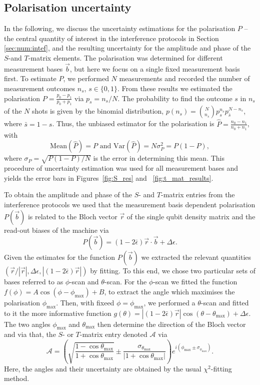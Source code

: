 \documentclass[a4paper,twocolumn,11pt]{quantumarticle}
\begin{document}
\subsection{Polarisation uncertainty} \label{app:DATA_Anl}In the following, we discuss the uncertainty estimations for the polarisation $P$ -- the central quantity of interest in the interference protocols in Section \ref{sec:num:intef}, and the resulting uncertainty for the amplitude and phase of the $S$-and $T$-matrix elements. The polarisation was determined for different measurement bases $\vec b$, but here we focus on a single fixed measurement basis first. To estimate $P$, we performed $N$ measurements and recorded the number of measurement outcomes $n_s$, $s\in \{0,1\}$. From these results we estimated the polarisation $P = \frac{p_0 - p_1}{p_0 + p_1}$ via $p_s=n_s/N$. The probability to find the outcome $s$ in $n_s$ of the $N$ shots is given by the binomial distribution, $p(n_s) = {N \choose n_s} p_s^{n_s} p_{\bar{s}}^{N-n_s}$, where $\bar{s} = 1-s$. Thus,
the unbiased estimator for the polarisation is $\hat P = \frac{n_0 - n_1}{n_0 + n_1}$, with $$\text{Mean}(\hat P) =P\text{ and }\text{Var}(\hat{P}) = N\sigma_{P}^2 = P(1-P),$$ where $\sigma_{P}=\sqrt{P(1-P)/N}$ is the error in determining this mean. This procedure of uncertainty estimation was used for all measurement bases and yields the error bars in Figures~\ref{fig:S_res} and ~\ref{fig:t_mat_results}.

To obtain the amplitude and phase of the $S$- and $T$-matrix entries from the interference protocols we used that the measurement basis dependent polarisation $P(\vec b)$ is related to the Bloch vector $\vec r$ of the single qubit density matrix and the read-out biases of the machine via
$$P(\vec{b}) = (1-2\bar\epsilon)\vec{r}\cdot\vec{b} + \Delta\epsilon.$$ 
Given the estimates for the function $P(\vec{b})$ we extracted the relevant quantities $(\vec{r}/|\vec{r}|, \Delta\epsilon, |(1-2\bar\epsilon)\vec{r}|)$ by fitting. To this end, we chose two particular sets of bases referred to as $\phi$-scan and $\theta$-scan. For the $\phi$-scan we fitted the function $f(\phi) = A\cos(\phi - \phi_{\text{max}})+B$, to extract the angle which maximises the polarisation $\phi_{\text{max}}$. Then, with fixeed $\phi = \phi_{\text{max}}$, we performed a $\theta$-scan and fitted to it the more informative function $g(\theta) = |(1-2\bar\epsilon)\vec{r}|\cos(\theta - \theta_{\text{max}}) + \Delta\epsilon$. The two angles $\phi_\text{max}$ and $\theta_\text{max}$ then determine the direction of the Bloch vector and via that, the $S$- or $T$-matrix entry denoted $\mathcal A$ via  
$$\mathcal{A} = \left(\sqrt{\frac{1-\cos{\theta_\text{max}}}{1+\cos{\theta_\text{max}}}}\pm \frac{\sigma_{\theta_\text{max}}}{|1 +\cos{\theta_\text{max}|}}\right)e^{i(\phi_\text{max}\pm \sigma_{\phi_\text{max}})}.$$
Here, the angles and their uncertainty are obtained by the usual $\chi^2$-fitting method.
 
\end{document}

